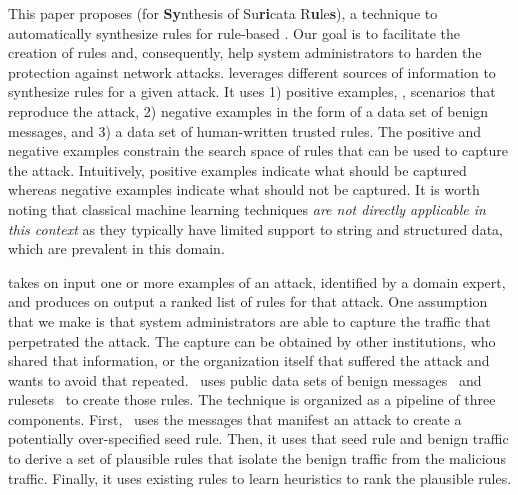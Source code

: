 \documentclass[conference]{IEEEtran}
\begin{document}
\sloppy This paper proposes \tname{} (for \textbf{Sy}nthesis of
Su\textbf{ri}cata R\textbf{u}le\textbf{s}), a technique to
automatically synthesize rules for rule-based \nids. Our goal is to
facilitate the creation of rules and, consequently, help system
administrators to harden the protection against network attacks.
\tname{} leverages different sources of information to synthesize
rules for a given attack. It uses 1) positive examples, \ie{},
scenarios that reproduce the attack, 2) negative examples in the form
of a data set of benign messages, and 3) a data set of human-written
trusted rules. The positive and negative examples constrain the search
space of rules that can be used to capture the attack. Intuitively,
positive examples indicate what should be captured whereas negative
examples indicate what should not be captured. It is worth noting that
classical machine learning techniques \emph{are not directly
  applicable in this context} as they typically have limited support
to string and structured data, which are prevalent in this domain.




\tname{} takes on input one or more examples of an attack, identified by a domain expert, and produces
on output a ranked list of rules for that attack. One assumption that
we make is that system administrators are able to capture the traffic
that perpetrated the attack. The capture can be obtained by other
institutions, who shared that information, or the organization itself
that suffered the attack and wants to avoid that
repeated. \tname\ uses public data sets of benign
messages~\cite{tcpreplay,stratosphere-normal} and
rulesets~\cite{emerging-threats-open} to create those rules. The
technique is organized as a pipeline of three components. First,
\tname\ uses the messages that manifest an attack to create a
potentially over-specified seed rule. Then, it uses that seed rule and
benign traffic to derive a set of plausible rules that isolate the
benign traffic from the malicious traffic. Finally, it uses existing
rules to learn heuristics to rank the plausible rules.
\end{document}
